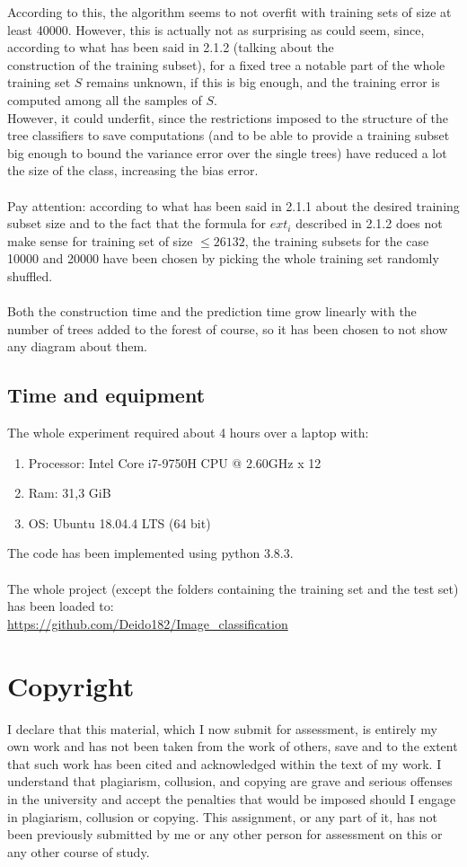 \documentclass[12pt]{article}
\begin{document}
According to this, the algorithm seems to not overfit with training sets of size at least 40000. However, this is actually not as surprising as could seem, since, according to what has been said in 2.1.2 (talking about the\\ construction of the training subset), for a fixed tree a notable part of the whole training set $S$ remains unknown, if this is big enough, and the training error is computed among all the samples of $S$.\\
However, it could underfit, since the restrictions imposed to the structure of the tree classifiers to save computations (and to be able to provide a training subset big enough to bound the variance error over the single trees) have reduced a lot the size of the class, increasing the bias error.\\\\
Pay attention: according to what has been said in 2.1.1 about the desired training subset size and to the fact that the formula for $ext_i$ described in 2.1.2 does not make sense for training set of size $\le 26132$, the training subsets for the case 10000 and 20000 have been chosen by picking the whole training set randomly shuffled.\\\\
Both the construction time and the prediction time grow linearly with the number of trees added to the forest of course, so it has been chosen to not show any diagram about them.
\subsection{Time and equipment}
The whole experiment required about 4 hours over a laptop with:
\begin{enumerate}
\item Processor: Intel Core i7-9750H CPU @ 2.60GHz x 12
\item Ram: 31,3 GiB
\item OS: Ubuntu 18.04.4 LTS (64 bit)
\end{enumerate}
The code has been implemented using python 3.8.3.\\\\
The whole project (except the folders containing the training set and the test set) has been loaded to:\\
\url{https://github.com/Deido182/Image_classification}
\newpage
\section{Copyright}
I declare that this material, which I now submit for assessment, is entirely my own work and has not been taken from the work of others, save and to the extent that such work has been cited and acknowledged within the text of my work. I understand that plagiarism, collusion, and copying are grave and serious offenses in the university and accept the penalties that would be imposed should I engage in plagiarism, collusion or copying. This assignment, or any part of it, has not been previously submitted by me or any other person for assessment on this or any other course of study.
\end{document}
